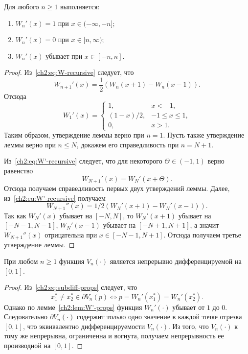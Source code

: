 {\begin{lemma}\label{ch2:lem:W'-props}
  Для любого $n \geqslant 1$ выполняется\textnormal{:}
  \begin{enumerate}
  \item $W_n'(x) = 1$ при $x \in (-\infty, -n];$
  \item $W_n'(x) = 0$ при $x \in [n, \infty);$
  \item $W_n'(x)$ убывает при $x \in [-n, n].$
  \end{enumerate}
\end{lemma}
\begin{proof}
  Из~\eqref{ch2:eq:W-recursive} следует, что
  \begin{equation}\label{ch2:eq:W'-recursive}
    W_{n+1}'(x) = \frac{1}{2} \left( W_n(x + 1) - W_n(x - 1) \right).
  \end{equation}
  Отсюда
  \begin{equation}\label{ch2:eq:W1'}
    W_1'(x) =
    \begin{cases}
      1, &x < -1, \\
      (1-x)/2,  &-1 \leqslant x \leqslant 1, \\
      0, &x > 1.
    \end{cases}
  \end{equation}
  Таким образом, утверждение леммы верно при $n = 1$.
  Пусть также утверждение леммы верно при $n \leqslant N$, докажем его справедливость при $n = N + 1$.

  Из~\eqref{ch2:eq:W'-recursive} следует, что для некоторого $\Theta \in (-1,1)$ верно равенство
  \[
    W_{N+1}'(x) = W_{N}'(x + \Theta).
  \]
  Отсюда получаем справедливость первых двух утверждений леммы.
  Далее, из~\eqref{ch2:eq:W'-recursive} получаем 
  \[
    W_{N+1}''(x) = 1/2 \left( W_{N}'(x + 1) - W_{N}'(x - 1) \right).
  \]
  Так как $W_N'(x)$ убывает на $[-N, N]$, то $W_N'(x + 1)$ убывает на $[-N-1, N - 1]$, $W_N'(x - 1)$ убывает на $[-N + 1, N+1]$, а значит $W_{N+1}''(x)$ отрицательна при $x \in [-N-1, N+1]$.
  Отсюда получаем третье утверждение леммы.
\end{proof}

\begin{proposition}
  При любом $n \geqslant 1$ функция $V_n(\cdot)$ является непрерывно дифференцируемой на $[0, 1]$.
\end{proposition}
\begin{proof}
  Из~\eqref{ch2:eq:subdiff-props} следует, что
  \begin{equation*}
    x_1^* \neq x_2^* \in \partial V_n(p) \iff p = W_n'(x_1^*) = W_n'(x_2^*).
  \end{equation*}
  Однако по лемме~\ref{ch2:lem:W'-props} функция $W_n'(\cdot)$ убывает от $1$ до $0$.
  Следовательно $\partial V_n(\cdot)$ содержит только одно значение в каждой точке отрезка $[0, 1]$, что эквивалентно дифференцируемости $V_n(\cdot)$.
  Из того, что $V_n(\cdot)$ к тому же непрерывна, ограниченна и вогнута, получаем непрерывность ее производной на $[0, 1]$.
\end{proof}

}
